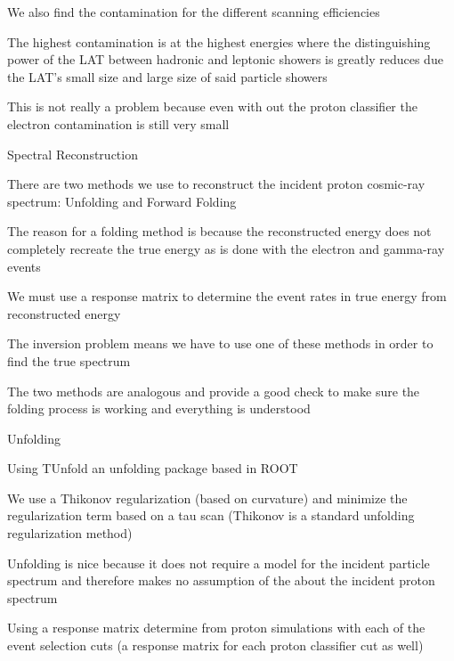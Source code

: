 \documentclass{article}
\begin{document}
\begin{myEnumerate}
\begin{myEnumerate}
\begin{myEnumerate}
				\item We also find the contamination for the different scanning efficiencies 
				\item The highest contamination is at the highest energies where the distinguishing power of the LAT between hadronic and leptonic showers is greatly reduces due the LAT's small size and large size of said particle showers
				\item This is not really a problem because even with out the proton classifier the electron contamination is still very small
			\end{myEnumerate}
		\end{myEnumerate}
		\item Spectral Reconstruction
		\begin{myEnumerate}
			\item There are two methods we use to reconstruct the incident proton cosmic-ray spectrum: Unfolding and Forward Folding
			\begin{myEnumerate}
				\item The reason for a folding method is because the reconstructed energy does not completely recreate the true energy as is done with the electron and gamma-ray events
				\item We must use a response matrix to determine the event rates in true energy from reconstructed energy
				\item The inversion problem means we have to use one of these methods in order to find the true spectrum
				\item The two methods are analogous and provide a good check to make sure the folding process is working and everything is understood
			\end{myEnumerate}
			\item Unfolding
			\begin{myEnumerate}
				\item Using TUnfold an unfolding package based in ROOT
				\item We use a Thikonov regularization (based on curvature) and minimize the regularization term based on a tau scan (Thikonov is a standard unfolding regularization method)
				\item Unfolding is nice because it does not require a model for the incident particle spectrum and therefore makes no assumption of the about the incident proton spectrum
				\item Using a response matrix determine from proton simulations with each of the event selection cuts (a response matrix for each proton classifier cut as well)

\end{myEnumerate}
\end{myEnumerate}
\end{myEnumerate}
\end{document}
